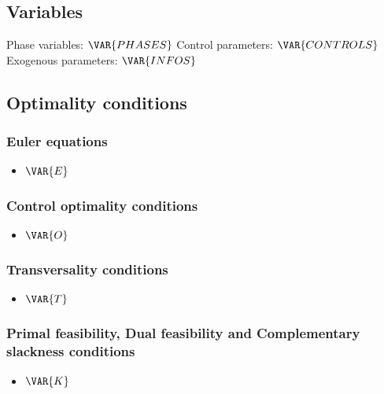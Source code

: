 \documentclass{article}
\begin{document}
\subsection{Variables}

Phase variables: $\VAR{PHASES}$
\newline
Control parameters: $\VAR{CONTROLS}$
\newline
Exogenous parameters: $\VAR{INFOS}$

\subsection{Optimality conditions}
\subsubsection{Euler equations}
\begin{itemize}
    \item $\VAR{E}$
\end{itemize}

\subsubsection{Control optimality conditions}
\begin{itemize}
    \item $\VAR{O}$
\end{itemize}

\subsubsection{Transversality conditions}
\begin{itemize}
    \item $\VAR{T}$
\end{itemize}

\subsubsection{Primal feasibility, Dual feasibility and Complementary slackness conditions}
\begin{itemize}
    \item $\VAR{K}$
\end{itemize}
\end{document}
